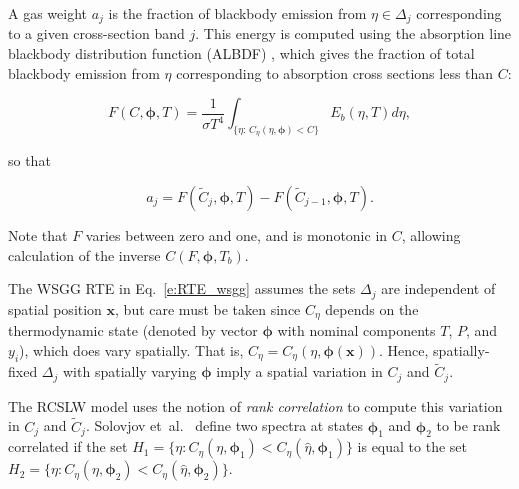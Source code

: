 \documentclass[preprint,12pt, a4paper]{elsarticle}
\newcommand{\BS}{\boldsymbol}
\begin{document}
A gas weight $a_j$ is the fraction of blackbody emission from $\eta\in\Delta_j$ corresponding to a given cross-section band $j$. This energy is computed using the absorption line blackbody distribution function (ALBDF) \cite{Pearson_2014}, which gives the fraction of total blackbody emission from $\eta$ corresponding to absorption cross sections less than $C$: 
%
\begin{linenomath}
    \begin{equation} \label{e:albdf}
        F(C,\BS{\phi},T) = \frac{1}{\sigma T^4}\int_{\{\eta:\,C_\eta(\eta,\BS{\phi})<C\}}E_b(\eta,T)d\eta,
\end{equation}
\end{linenomath}
%
so that
%
\begin{linenomath}
    \begin{equation}\label{e:aj}
    a_j = F(\tilde{C}_j,\BS{\phi}, T) - F(\tilde{C}_{j-1}, \BS{\phi},T).
\end{equation}
\end{linenomath}
%
Note that $F$ varies between zero and one, and is monotonic in $C$, allowing calculation of the inverse $C(F,\BS{\phi},T_b)$.

The WSGG RTE in Eq.~\ref{e:RTE_wsgg} assumes the sets $\Delta_j$ are independent of spatial position $\mathbf{x}$, but care must be taken since $C_\eta$ depends on the thermodynamic state (denoted by vector $\BS{\phi}$ with nominal components $T$, $P$, and $y_i$), which does vary spatially. That is, $C_\eta=C_\eta(\eta,\BS{\phi}(\mathbf{x}))$. Hence, spatially-fixed $\Delta_j$ with spatially varying $\BS{\phi}$ imply a spatial variation in $C_j$ and $\tilde{C}_j$.
 
The RCSLW model uses the notion of \emph{rank correlation} to compute this variation in $C_j$ and $\tilde{C}_j$. Solovjov et~al.~\cite{Solovjov_2017} define two spectra at states $\BS{\phi}_1$ and $\BS{\phi}_2$ to be rank correlated 
if the set $H_1=\{\eta: C_\eta(\eta,\BS{\phi}_1)<C_\eta(\hat{\eta},\BS{\phi}_1)\}$ is equal to the set
$H_2=\{\eta: C_\eta(\eta,\BS{\phi}_2)<C_\eta(\hat{\eta},\BS{\phi}_2)\}$.
 
\end{document}
